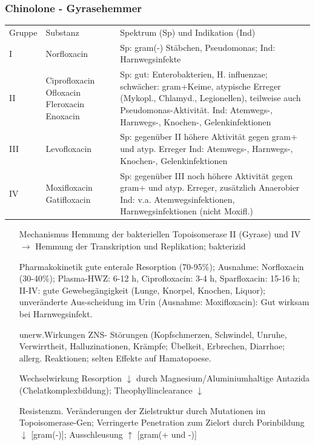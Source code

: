 \documentclass[10pt,a4paper]{report}
\begin{document}
\subsubsection{Chinolone - Gyrasehemmer} %
\label{ssub:chinolone_gyrasehemmer}
\begin{tabularx}{\textwidth}{lXX}
Gruppe&Substanz&Spektrum (Sp) und Indikation (Ind)\\
I&Norfloxacin&Sp: gram(-) Stäbchen, Pseudomonas; Ind: Harnwegsinfekte\\
II&Ciprofloxacin Ofloxacin Fleroxacin Enoxacin&Sp: gut: Enterobakterien, H. influenzae; schwächer: gram+Keime, atypische Erreger (Mykopl., Chlamyd., Legionellen), teilweise auch Pseudomonas-Aktivität. Ind: Atemwegs-, Harnwegs-, Knochen-, Gelenkinfektionen\\
III&Levofloxacin&Sp: gegenüber II höhere Aktivität gegen gram+ und atyp. Erreger Ind: Atemwegs-, Harnwegs-, Knochen-, Gelenkinfektionen\\
IV&Moxifloxacin Gatifloxacin&Sp: gegenüber III noch höhere Aktivität gegen gram+ und atyp. Erreger, zusätzlich Anaerobier Ind: v.a. Atemwegsinfektionen, Harnwegsinfektionen (nicht Moxifl.)\\
\end{tabularx}
\begin{itemize}
	\item[Mechanismus] Hemmung der bakteriellen Topoisomerase II (Gyrase) und IV $\rightarrow$ Hemmung der Transkription und Replikation; bakterizid
	\item[Pharmakokinetik] gute enterale Resorption (70-95\%); Ausnahme: Norfloxacin (30-40\%); Plasma-HWZ: 6-12 h, Ciprofloxacin: 3-4 h, Sparfloxacin: 15-16 h;  II-IV: gute Gewebegängigkeit (Lunge, Knorpel, Knochen, Liquor); unveränderte Aus-scheidung im Urin (Ausnahme: Moxifloxacin): Gut wirksam bei Harnwegsinfekt.
	\item[unerw.Wirkungen] ZNS- Störungen (Kopfschmerzen, Schwindel, Unruhe, Verwirrtheit, Halluzinationen, Krämpfe; Übelkeit, Erbrechen, Diarrhoe; allerg. Reaktionen; selten Effekte auf Hamatopoese.
	\item[Wechselwirkung] Resorption $\downarrow$ durch Magnesium/Aluminiumhaltige Antazida (Chelatkomplexbildung); Theophyllinclearance $\downarrow$ 
	\item[Resistenzm.] Veränderungen der Zielstruktur durch Mutationen im Topoisomerase-Gen; Verringerte Penetration zum Zielort durch Porinbildung $\downarrow$ [gram(-)]; Ausschleusung $\uparrow$ [gram(+ und -)]
\end{itemize}
\end{document}
